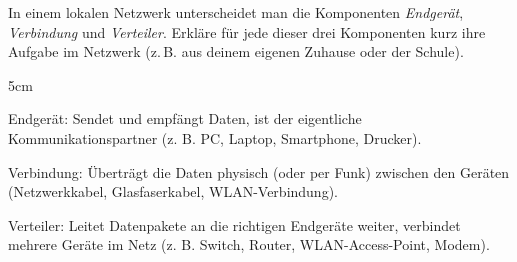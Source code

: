 \question[3]
In einem lokalen Netzwerk unterscheidet man die Komponenten \emph{Endgerät}, 
\emph{Verbindung} und \emph{Verteiler}.
Erkläre für jede dieser drei Komponenten kurz ihre Aufgabe im Netzwerk  (z.\,B. aus deinem eigenen Zuhause oder der Schule).

\begin{solutionbox}{5cm}
 
Endgerät: Sendet und empfängt Daten, ist der eigentliche
Kommunikationspartner (z. B. PC, Laptop, Smartphone, Drucker).

Verbindung: Überträgt die Daten physisch (oder per Funk)
zwischen den Geräten (Netzwerkkabel, Glasfaserkabel, WLAN-Verbindung).

Verteiler: Leitet Datenpakete an die richtigen Endgeräte
weiter, verbindet mehrere Geräte im Netz (z. B. Switch, Router,
WLAN-Access-Point, Modem).
 
\end{solutionbox}